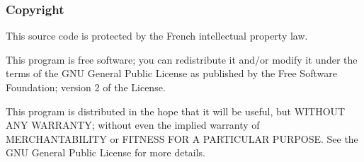\subsubsection*{Copyright}

This source code is protected by the French intellectual property law.

This program is free software; you can redistribute it and/or modify it under the terms of the G\-N\-U General Public License as published by the Free Software Foundation; version 2 of the License.

This program is distributed in the hope that it will be useful, but W\-I\-T\-H\-O\-U\-T A\-N\-Y W\-A\-R\-R\-A\-N\-T\-Y; without even the implied warranty of M\-E\-R\-C\-H\-A\-N\-T\-A\-B\-I\-L\-I\-T\-Y or F\-I\-T\-N\-E\-S\-S F\-O\-R A P\-A\-R\-T\-I\-C\-U\-L\-A\-R P\-U\-R\-P\-O\-S\-E. See the G\-N\-U General Public License for more details. 